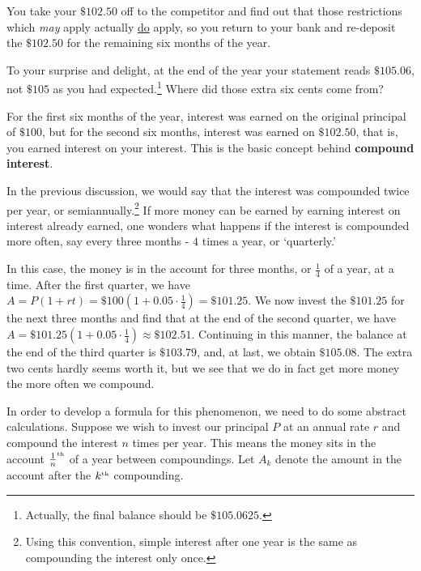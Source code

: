 \smallskip

You take your $\$102.50$ off to the competitor and find out that those restrictions which \textit{may} apply actually \underline{do} apply, so you return to your bank and re-deposit the $\$102.50$ for the remaining six months of the year. 

\smallskip 

To your surprise and delight, at the end of the year your statement reads $\$105.06$, not $\$105$ as you had expected.\footnote{Actually, the final balance should be $\$105.0625$.}  Where did those extra six cents come from?  

\smallskip

For the first six months of the year, interest was earned on the original principal of $\$100$, but for the second six months, interest was earned on $\$102.50$, that is, you earned interest on your interest.  This is the basic concept behind \textbf{compound interest}. 

\smallskip

In the previous discussion, we would say that the interest was compounded twice per year, or semiannually.\footnote{Using this convention, simple interest after one year is the same as compounding the interest only once.}  If more money can be earned by earning interest on interest already earned, one wonders what happens if the interest is compounded more often, say every three months -  $4$ times a year, or `quarterly.' 

\smallskip

In this case, the money is in the account for three months, or $\frac{1}{4}$ of a year, at a time.  After the first quarter, we have $A = P(1+rt) =  \$100 \left(1 + 0.05 \cdot \frac{1}{4} \right) = \$101.25$.  We now invest the $\$101.25$ for the next three months and find that at the end of the second quarter, we have $A =  \$101.25 \left(1 + 0.05 \cdot \frac{1}{4} \right)\approx \$102.51$.  Continuing in this manner, the balance at the end of the third quarter is $\$103.79$, and, at last, we obtain $\$105.08$.  The extra two cents hardly seems worth it, but we see that we do in fact get more money the more often we compound. 

\smallskip

In order to develop a formula for this phenomenon, we need to do some abstract calculations.  Suppose we wish to invest our principal $P$ at an annual rate $r$ and compound the interest $n$ times per year.  This means the money sits in the account $\frac{1}{n}^{\mbox{\tiny th}}$ of a year between compoundings.  Let $A_{k}$ denote the amount in the account after the $k^{\mbox{\tiny th}}$ compounding. 

